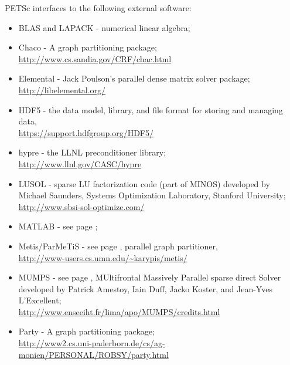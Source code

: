 \vspace{.3in}
\noindent
PETSc interfaces to the following external software:
\begin{itemize}
  \item BLAS and LAPACK - numerical linear algebra;
  \item Chaco - A graph partitioning package;\\\href{http://www.cs.sandia.gov/CRF/chac.html}{http://www.cs.sandia.gov/CRF/chac.html}
  \item Elemental -  Jack Poulson's parallel dense matrix solver package;\\\href{http://libelemental.org/}{http://libelemental.org/}
  \item HDF5 - the data model, library, and file format for storing and managing data,\\\href{https://support.hdfgroup.org/HDF5/}{https://support.hdfgroup.org/HDF5/}
  \item hypre -    the LLNL preconditioner library;\\\href{http://www.llnl.gov/CASC/hypre}{http://www.llnl.gov/CASC/hypre}
  \item LUSOL -       sparse LU factorization code (part of MINOS) developed by Michael Saunders,
                      Systems Optimization Laboratory, Stanford University;\\
                     \href{http://www.sbsi-sol-optimize.com/}{http://www.sbsi-sol-optimize.com/}
  \item MATLAB -      see page \pageref{ch_matlab};
  \item Metis/ParMeTiS - see page \pageref{sec_partitioning}, parallel graph partitioner,\\
                     \href{http://www-users.cs.umn.edu/~karypis/metis/}{http://www-users.cs.umn.edu/\~{}karypis/metis/}
  \item MUMPS -      see page \pageref{sec_externalsol}, MUltifrontal Massively Parallel sparse direct Solver developed by Patrick Amestoy,
                     Iain Duff, Jacko Koster, and Jean-Yves L'Excellent; \\
                     \href{http://www.enseeiht.fr/lima/apo/MUMPS/credits.html}{http://www.enseeiht.fr/lima/apo/MUMPS/credits.html}
  \item Party -     A graph partitioning package; \\ 
               \href{http://www2.cs.uni-paderborn.de/cs/ag-monien/PERSONAL/ROBSY/party.html}{http://www2.cs.uni-paderborn.de/cs/ag-monien/PERSONAL/ROBSY/party.html}

\end{itemize}
